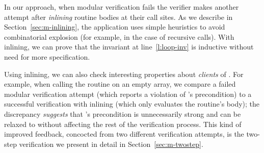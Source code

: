 In our approach, when modular verification fails the verifier makes another attempt after \emph{inlining} routine bodies at their call sites.
As we describe in Section~\ref{sec:m-inlining}, the application uses simple heuristics to avoid combinatorial explosion (for example, in the case of recursive calls).
With inlining, we can prove that the invariant at line~\ref{l:loop-inv} is inductive without need for more specification.

Using inlining, we can also check interesting properties about \emph{clients} of .
For example, when calling the routine on an empty array, we compare a failed modular verification attempt (which reports a violation of 's precondition) to a successful verification with inlining (which only evaluates the routine's body); the discrepancy \emph{suggests} that 's precondition is unnecessarily strong and can be relaxed to  without affecting the rest of the verification process.
This kind of improved feedback, concocted from two different verification attempts, is the two-step verification we present in detail in Section~\ref{sec:m-twostep}.

